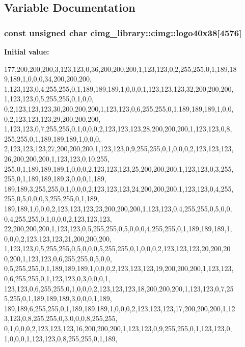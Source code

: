 \subsection{Variable Documentation}
\hypertarget{namespacecimg__library_1_1cimg_a15d560f627f5a64c31d1539c3e157f6a}{
\subsubsection[{logo40x38}]{\setlength{\rightskip}{0pt plus 5cm}const unsigned char cimg\_\-library::cimg::logo40x38\mbox{[}4576\mbox{]}}}
\label{namespacecimg__library_1_1cimg_a15d560f627f5a64c31d1539c3e157f6a}
{\bfseries Initial value:}
\begin{DoxyCode}
 {
      177,200,200,200,3,123,123,0,36,200,200,200,1,123,123,0,2,255,255,0,1,189,18
      9,189,1,0,0,0,34,200,200,200,
      1,123,123,0,4,255,255,0,1,189,189,189,1,0,0,0,1,123,123,123,32,200,200,200,
      1,123,123,0,5,255,255,0,1,0,0,
      0,2,123,123,123,30,200,200,200,1,123,123,0,6,255,255,0,1,189,189,189,1,0,0,
      0,2,123,123,123,29,200,200,200,
      1,123,123,0,7,255,255,0,1,0,0,0,2,123,123,123,28,200,200,200,1,123,123,0,8,
      255,255,0,1,189,189,189,1,0,0,0,
      2,123,123,123,27,200,200,200,1,123,123,0,9,255,255,0,1,0,0,0,2,123,123,123,
      26,200,200,200,1,123,123,0,10,255,
      255,0,1,189,189,189,1,0,0,0,2,123,123,123,25,200,200,200,1,123,123,0,3,255,
      255,0,1,189,189,189,3,0,0,0,1,189,
      189,189,3,255,255,0,1,0,0,0,2,123,123,123,24,200,200,200,1,123,123,0,4,255,
      255,0,5,0,0,0,3,255,255,0,1,189,
      189,189,1,0,0,0,2,123,123,123,23,200,200,200,1,123,123,0,4,255,255,0,5,0,0,
      0,4,255,255,0,1,0,0,0,2,123,123,123,
      22,200,200,200,1,123,123,0,5,255,255,0,5,0,0,0,4,255,255,0,1,189,189,189,1,
      0,0,0,2,123,123,123,21,200,200,200,
      1,123,123,0,5,255,255,0,5,0,0,0,5,255,255,0,1,0,0,0,2,123,123,123,20,200,20
      0,200,1,123,123,0,6,255,255,0,5,0,0,
      0,5,255,255,0,1,189,189,189,1,0,0,0,2,123,123,123,19,200,200,200,1,123,123,
      0,6,255,255,0,1,123,123,0,3,0,0,0,1,
      123,123,0,6,255,255,0,1,0,0,0,2,123,123,123,18,200,200,200,1,123,123,0,7,25
      5,255,0,1,189,189,189,3,0,0,0,1,189,
      189,189,6,255,255,0,1,189,189,189,1,0,0,0,2,123,123,123,17,200,200,200,1,12
      3,123,0,8,255,255,0,3,0,0,0,8,255,255,
      0,1,0,0,0,2,123,123,123,16,200,200,200,1,123,123,0,9,255,255,0,1,123,123,0,
      1,0,0,0,1,123,123,0,8,255,255,0,1,189,
}
\end{DoxyCode}
